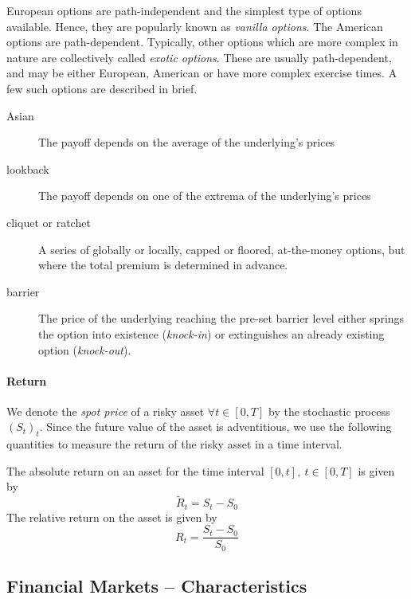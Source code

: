 European options are path-independent and the simplest type of options available. Hence, they are popularly known as \emph{vanilla options}. The American options are path-dependent. Typically, other options which are more complex in nature are collectively called \emph{exotic options}. These are usually path-dependent, and may be either European, American or have more complex exercise times. A few such options are described in brief.
\begin{description}
	\item[Asian] The payoff depends on the average of the underlying's prices
	\item[lookback] The payoff depends on one of the extrema of the underlying's prices
	\item[cliquet or ratchet] A series of globally or locally, capped or floored, at-the-money options, but where the total premium is determined in advance.
	\item[barrier] The price of the underlying reaching the pre-set barrier level either springs the option into existence (\emph{knock-in}) or extinguishes an already existing option (\emph{knock-out}).
\end{description}


\paragraph{Return}
We denote the \emph{spot price} of a risky asset $ \forall t \in [0, T] $ by the stochastic process $ (S_t)_t $. Since the future value of the asset is adventitious, we use the following quantities to measure the return of the risky asset in a time interval.

\begin{dfn}
	The absolute return on an asset for the time interval $ [0, t], \  t \in [0, T] $ is given by
	\begin{equation*}
		\tilde{R}_t = S_t - S_0
	\end{equation*}
	The relative return on the asset is given by
	\begin{equation*}
		R_t = \frac{S_t - S_0}{S_0}
	\end{equation*}	
\end{dfn}



\subsection{Financial Markets -- Characteristics}
\label{subsec:intro-market-char}

